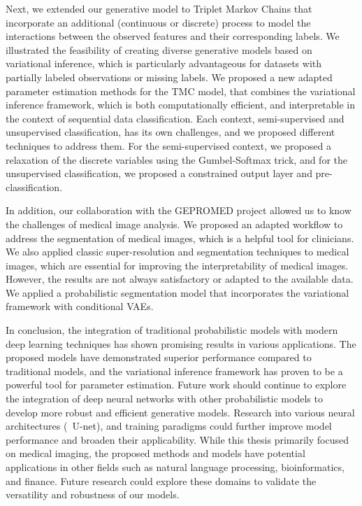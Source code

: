 Next, we extended our generative model to Triplet Markov Chains that 
incorporate an additional (continuous or discrete) process to model 
the interactions between the 
observed features and their corresponding labels. We illustrated the 
feasibility of creating diverse generative models based on
variational inference, which is particularly advantageous for datasets with
partially labeled observations or missing labels.
We proposed a new adapted parameter estimation methods for the TMC model,
that combines the variational inference framework, 
which is both computationally efficient, and interpretable in the context of 
sequential data classification.
Each context, semi-supervised and unsupervised classification, 
has its own challenges,
and we proposed different techniques to address them.
For the semi-supervised context, we proposed a relaxation of the discrete
variables using the Gumbel-Softmax trick, and 
for the unsupervised classification, we proposed a constrained output layer
and pre-classification.
\vspace{0.27cm}


In addition, our collaboration with the GEPROMED project allowed us to know the
challenges of medical image analysis. We proposed an adapted workflow to
address the segmentation of medical images, which is a helpful tool for
clinicians. We also applied classic super-resolution and segmentation
techniques to medical images, which are essential for improving the
interpretability of medical images. However, the results are not always
satisfactory or adapted to the available data. 
We applied a probabilistic segmentation model that incorporates the 
variational framework with conditional VAEs. 
\vspace{0.27cm}



In conclusion, the integration of traditional probabilistic models with
modern deep learning techniques has shown promising results in various
applications. The proposed models have demonstrated superior performance
compared to traditional models, and the variational inference framework has
proven to be a powerful tool for parameter estimation. 
Future work should continue to explore the integration of deep neural networks
with other probabilistic models to develop more robust and efficient generative models.
Research into various neural architectures (\eg~U-net),
and training paradigms could further
improve model performance and broaden their applicability.
While this thesis primarily focused on medical imaging, the proposed methods and
models have potential applications in other fields such as natural language
processing, bioinformatics, and finance. Future research could explore these
domains to validate the versatility and robustness of our models.
\vspace{0.27cm}

